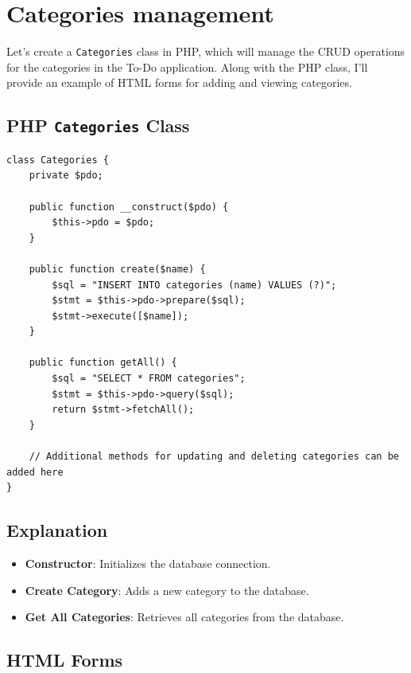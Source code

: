 \documentclass[11pt]{article}
\date{}
\title{}
\begin{document}
\setcounter{tocdepth}{3}
\tableofcontents

\setlength\parindent{10pt}

\section{Categories management}
\label{sec:org0aa5a93}
 Let's create a \texttt{Categories} class in PHP, which will manage
the CRUD operations for the categories in the To-Do application. Along
with the PHP class, I'll provide an example of HTML forms for adding and
viewing categories.

\subsection{PHP \texttt{Categories} Class}
\label{sec:orge232c6b}
\begin{verbatim}
class Categories {
    private $pdo;

    public function __construct($pdo) {
        $this->pdo = $pdo;
    }

    public function create($name) {
        $sql = "INSERT INTO categories (name) VALUES (?)";
        $stmt = $this->pdo->prepare($sql);
        $stmt->execute([$name]);
    }

    public function getAll() {
        $sql = "SELECT * FROM categories";
        $stmt = $this->pdo->query($sql);
        return $stmt->fetchAll();
    }

    // Additional methods for updating and deleting categories can be added here
}
\end{verbatim}

\subsection{Explanation}
\label{sec:org60f192e}
\begin{itemize}
\item \textbf{Constructor}: Initializes the database connection.
\item \textbf{Create Category}: Adds a new category to the database.
\item \textbf{Get All Categories}: Retrieves all categories from the database.
\end{itemize}

\subsection{HTML Forms}
\label{sec:org9f48222}
\end{document}
